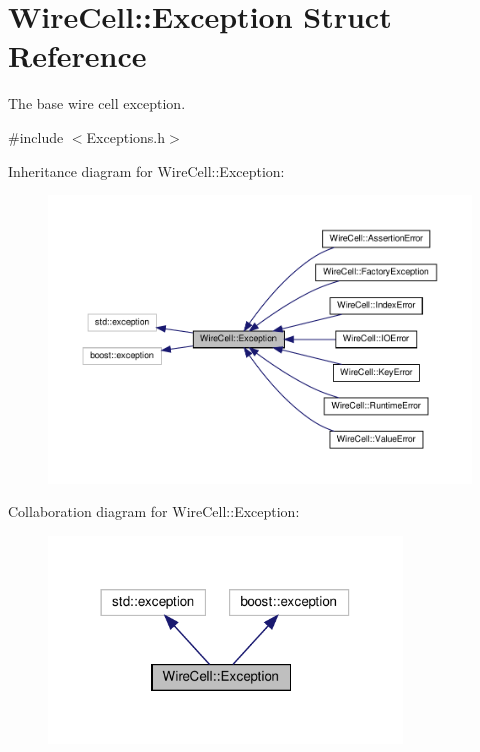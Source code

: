 \hypertarget{struct_wire_cell_1_1_exception}{}\section{Wire\+Cell\+:\+:Exception Struct Reference}
\label{struct_wire_cell_1_1_exception}


The base wire cell exception.  




{\ttfamily \#include $<$Exceptions.\+h$>$}



Inheritance diagram for Wire\+Cell\+:\+:Exception\+:
\nopagebreak
\begin{figure}[H]
\begin{center}
\leavevmode
\includegraphics[width=350pt]{struct_wire_cell_1_1_exception__inherit__graph}
\end{center}
\end{figure}


Collaboration diagram for Wire\+Cell\+:\+:Exception\+:
\nopagebreak
\begin{figure}[H]
\begin{center}
\leavevmode
\includegraphics[width=266pt]{struct_wire_cell_1_1_exception__coll__graph}
\end{center}
\end{figure}
